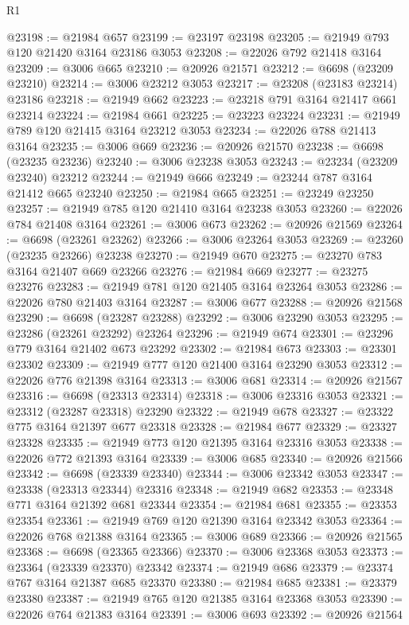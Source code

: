 \begin{lexlean}{R1}
\begin{coremodule}
@23198 := @21984 @657
@23199 := @23197 @23198
@23205 := @21949 @793 @120 @21420 @3164 @23186 @3053
@23208 := @22026 @792 @21418 @3164
@23209 := @3006 @665
@23210 := @20926 @21571
@23212 := @6698 (@23209 @23210)
@23214 := @3006 @23212 @3053
@23217 := @23208 (@23183 @23214) @23186
@23218 := @21949 @662
@23223 := @23218 @791 @3164 @21417 @661 @23214
@23224 := @21984 @661
@23225 := @23223 @23224
@23231 := @21949 @789 @120 @21415 @3164 @23212 @3053
@23234 := @22026 @788 @21413 @3164
@23235 := @3006 @669
@23236 := @20926 @21570
@23238 := @6698 (@23235 @23236)
@23240 := @3006 @23238 @3053
@23243 := @23234 (@23209 @23240) @23212
@23244 := @21949 @666
@23249 := @23244 @787 @3164 @21412 @665 @23240
@23250 := @21984 @665
@23251 := @23249 @23250
@23257 := @21949 @785 @120 @21410 @3164 @23238 @3053
@23260 := @22026 @784 @21408 @3164
@23261 := @3006 @673
@23262 := @20926 @21569
@23264 := @6698 (@23261 @23262)
@23266 := @3006 @23264 @3053
@23269 := @23260 (@23235 @23266) @23238
@23270 := @21949 @670
@23275 := @23270 @783 @3164 @21407 @669 @23266
@23276 := @21984 @669
@23277 := @23275 @23276
@23283 := @21949 @781 @120 @21405 @3164 @23264 @3053
@23286 := @22026 @780 @21403 @3164
@23287 := @3006 @677
@23288 := @20926 @21568
@23290 := @6698 (@23287 @23288)
@23292 := @3006 @23290 @3053
@23295 := @23286 (@23261 @23292) @23264
@23296 := @21949 @674
@23301 := @23296 @779 @3164 @21402 @673 @23292
@23302 := @21984 @673
@23303 := @23301 @23302
@23309 := @21949 @777 @120 @21400 @3164 @23290 @3053
@23312 := @22026 @776 @21398 @3164
@23313 := @3006 @681
@23314 := @20926 @21567
@23316 := @6698 (@23313 @23314)
@23318 := @3006 @23316 @3053
@23321 := @23312 (@23287 @23318) @23290
@23322 := @21949 @678
@23327 := @23322 @775 @3164 @21397 @677 @23318
@23328 := @21984 @677
@23329 := @23327 @23328
@23335 := @21949 @773 @120 @21395 @3164 @23316 @3053
@23338 := @22026 @772 @21393 @3164
@23339 := @3006 @685
@23340 := @20926 @21566
@23342 := @6698 (@23339 @23340)
@23344 := @3006 @23342 @3053
@23347 := @23338 (@23313 @23344) @23316
@23348 := @21949 @682
@23353 := @23348 @771 @3164 @21392 @681 @23344
@23354 := @21984 @681
@23355 := @23353 @23354
@23361 := @21949 @769 @120 @21390 @3164 @23342 @3053
@23364 := @22026 @768 @21388 @3164
@23365 := @3006 @689
@23366 := @20926 @21565
@23368 := @6698 (@23365 @23366)
@23370 := @3006 @23368 @3053
@23373 := @23364 (@23339 @23370) @23342
@23374 := @21949 @686
@23379 := @23374 @767 @3164 @21387 @685 @23370
@23380 := @21984 @685
@23381 := @23379 @23380
@23387 := @21949 @765 @120 @21385 @3164 @23368 @3053
@23390 := @22026 @764 @21383 @3164
@23391 := @3006 @693
@23392 := @20926 @21564

\end{coremodule}
\end{lexlean}
